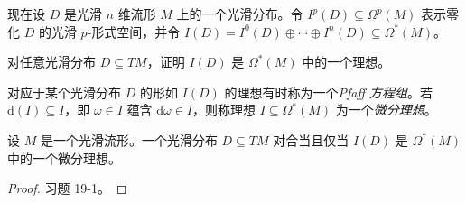 \documentclass[../../main.tex]{subfiles}
\begin{document}
现在设 $D$ 是光滑 $n$ 维流形 $M$ 上的一个光滑分布。令 $I^p(D)\subseteq\Omega^p(M)$ 表示零化 $D$ 的光滑 $p$-形式空间，并令 $I(D)=I^0(D)\oplus\cdots\oplus I^n(D)\subseteq\Omega^*(M)$。

\begin{exercise}\label{exercise:ch19-10}
对任意光滑分布 $D\subseteq TM$，证明 $I(D)$ 是 $\Omega^*(M)$ 中的一个理想。
\end{exercise}

对应于某个光滑分布 $D$ 的形如 $I(D)$ 的理想有时称为一个\emph{Pfaff 方程组}。若 $\mathrm{d}(I)\subseteq I$，即 $\omega\in I$ 蕴含 $\mathrm{d}\omega\in I$，则称理想 $I\subseteq\Omega^*(M)$ 为一个\emph{微分理想}。

\begin{proposition}[对合性的微分理想判别法]\label{proposition:ch19-微分理想判别}
设 $M$ 是一个光滑流形。一个光滑分布 $D\subseteq TM$ 对合当且仅当 $I(D)$ 是 $\Omega^*(M)$ 中的一个微分理想。
\end{proposition}

\begin{proof}
习题 19-1。
\end{proof}
\end{document}

